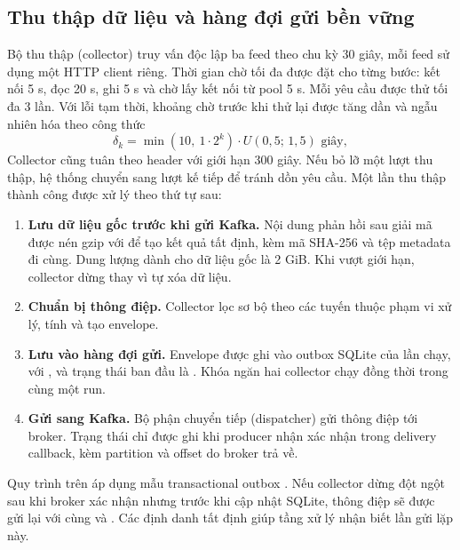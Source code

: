 \subsection{Thu thập dữ liệu và hàng đợi gửi bền vững}

Bộ thu thập (collector) truy vấn độc lập ba feed theo chu kỳ 30 giây, mỗi feed sử dụng một HTTP client riêng. Thời gian chờ tối đa được đặt cho từng bước: kết nối 5 s, đọc 20 s, ghi 5 s và chờ lấy kết nối từ pool 5 s. Mỗi yêu cầu được thử tối đa 3 lần. Với lỗi tạm thời, khoảng chờ trước khi thử lại được tăng dần và ngẫu nhiên hóa theo công thức
\begin{equation}
\delta_k = \min(10,\ 1 \cdot 2^k)\cdot U(0{,}5;\,1{,}5) \text{ giây},
\end{equation}
Collector cũng tuân theo header  với giới hạn 300 giây. Nếu bỏ lỡ một lượt thu thập, hệ thống chuyển sang lượt kế tiếp để tránh dồn yêu cầu. Một lần thu thập thành công được xử lý theo thứ tự sau:

\begin{enumerate}
    \item \textbf{Lưu dữ liệu gốc trước khi gửi Kafka.} Nội dung phản hồi sau giải mã được nén gzip với  để tạo kết quả tất định, kèm mã SHA-256 và tệp metadata đi cùng. Dung lượng dành cho dữ liệu gốc là 2 GiB. Khi vượt giới hạn, collector dừng thay vì tự xóa dữ liệu.
    \item \textbf{Chuẩn bị thông điệp.} Collector lọc sơ bộ theo các tuyến thuộc phạm vi xử lý, tính  và tạo envelope.
    \item \textbf{Lưu vào hàng đợi gửi.} Envelope được ghi vào outbox SQLite của lần chạy, với ,  và trạng thái ban đầu là . Khóa  ngăn hai collector chạy đồng thời trong cùng một run.
    \item \textbf{Gửi sang Kafka.} Bộ phận chuyển tiếp (dispatcher) gửi thông điệp tới broker. Trạng thái  chỉ được ghi khi producer nhận xác nhận trong delivery callback, kèm partition và offset do broker trả về.
\end{enumerate}

Quy trình trên áp dụng mẫu transactional outbox \cite{microservices_patterns}. Nếu collector dừng đột ngột sau khi broker xác nhận nhưng trước khi cập nhật SQLite, thông điệp sẽ được gửi lại với cùng  và . Các định danh tất định giúp tầng xử lý nhận biết lần gửi lặp này.

